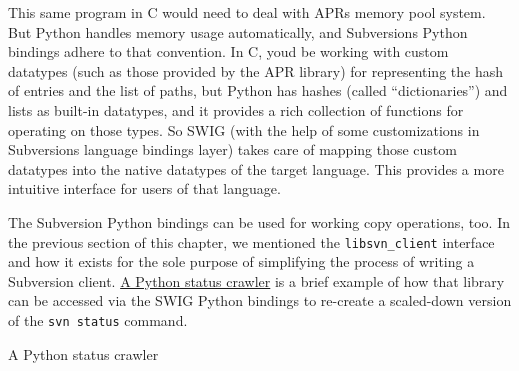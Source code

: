 This same program in C would need to deal with APR\textquotesingle s
memory pool system. But Python handles memory usage automatically, and
Subversion\textquotesingle s Python bindings adhere to that convention.
In C, you\textquotesingle d be working with custom datatypes (such as
those provided by the APR library) for representing the hash of entries
and the list of paths, but Python has hashes (called ``dictionaries'')
and lists as built-in datatypes, and it provides a rich collection of
functions for operating on those types. So SWIG (with the help of some
customizations in Subversion\textquotesingle s language bindings layer)
takes care of mapping those custom datatypes into the native datatypes
of the target language. This provides a more intuitive interface for
users of that language.

The Subversion Python bindings can be used for working copy operations,
too. In the previous section of this chapter, we mentioned the
\texttt{libsvn\_client} interface and how it exists for the sole purpose
of simplifying the process of writing a Subversion client.
\hyperref[svn.developer.usingapi.otherlangs.ex-2]{A Python status
crawler} is a brief example of how that library can be accessed via the
SWIG Python bindings to re-create a scaled-down version of the
\texttt{svn\ status} command.

\protect{}\label{svn.developer.usingapi.otherlangs.ex-2}
A Python status crawler

